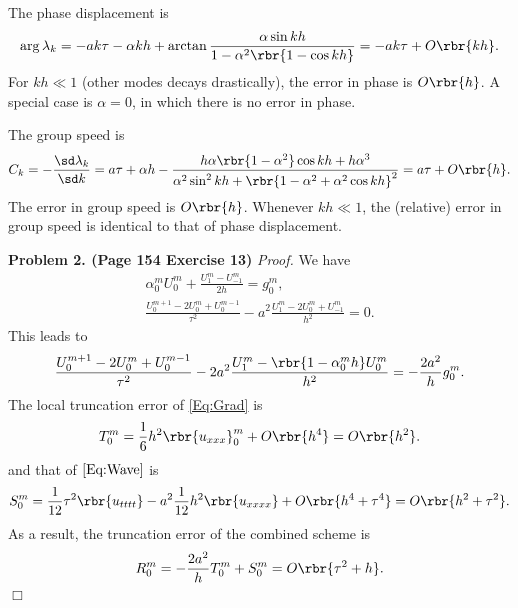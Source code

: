 \documentclass[english, nochinese]{pnote}
\begin{document}
The phase displacement is
\begin{equation}
\arg \lambda_k = -a k \tau - \alpha k h + \arctan \frac{ \alpha \sin k h }{ 1 - \alpha^2 \rbr{ 1 - \cos k h } } = -a k \tau + O \rbr{ k h }.
\end{equation}
For $ k h \ll 1 $ (other modes decays drastically), the error in phase is $ O \rbr{h} $. A special case is $ \alpha = 0 $, in which there is no error in phase.

The group speed is
\begin{equation}
C_k = -\frac{ \sd \lambda_k }{ \sd k } = a \tau + \alpha h - \frac{ h \alpha \rbr{ 1 - \alpha^2 } \cos k h + h \alpha^3 }{ \alpha^2 \sin^2 k h + \rbr{ 1 - \alpha^2 + \alpha^2 \cos k h }^2 } = a \tau + O \rbr{h}.
\end{equation}
The error in group speed is $ O \rbr{h} $. Whenever $ k h \ll 1 $, the (relative) error in group speed is identical to that of phase displacement.

\textbf{Problem 2. (Page 154 Exercise 13)} \textit{Proof.} We have
\begin{gather}
\label{Eq:Grad}
\alpha_0^m U_0^m + \frac{ U_1^m - U_{-1}^m }{ 2 h } = g_0^m, \\
\label{Eq:Wave}
\frac{ U_0^{ m + 1 } - 2 U_0^m + U_0^{ m - 1 } }{\tau^2} - a^2 \frac{ U_1^m - 2 U_0^m + U_{-1}^m }{h^2} = 0.
\end{gather}
This leads to
\begin{equation}
\frac{ U_0^{ m + 1 } - 2 U_0^m + U_0^{ m - 1 } }{\tau^2} - 2 a^2 \frac{ U_1^m - \rbr{ 1 - \alpha_0^m h } U_0^m }{h^2} = -\frac{ 2 a^2 }{h} g_0^m.
\end{equation}
The local truncation error of \eqref{Eq:Grad} is
\begin{equation}
T_0^m = \frac{1}{6} h^2 \rbr{u_{ x x x }}_0^m + O \rbr{h^4} = O \rbr{h^2}.
\end{equation}
and that of $\eqref{Eq:Wave}$ is
\begin{equation}
S_0^m = \frac{1}{12} \tau^2 \rbr{u_{ t t t t }} - a^2 \frac{1}{12} h^2 \rbr{u_{ x x x x }} + O \rbr{ h^4 + \tau^4 } = O \rbr{ h^2 + \tau^2 }.
\end{equation}
As a result, the truncation error of the combined scheme is
\begin{equation}
R_0^m = -\frac{ 2 a^2 }{h} T_0^m + S_0^m = O \rbr{ \tau^2 + h }.
\end{equation}
\hfill$\Box$
\end{document}
